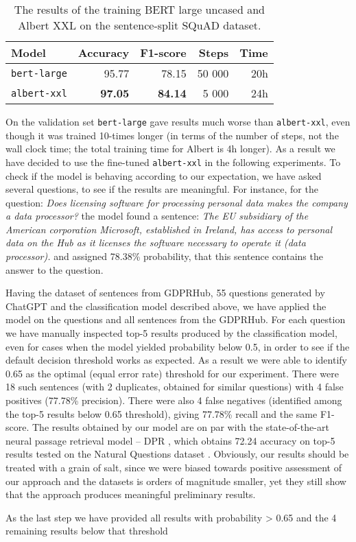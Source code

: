 \begin{table}[htbp]
    \centering\begin{tabular}{l r r r r}
        \hline
        \textbf{Model} & \textbf{Accuracy} & \textbf{F1-score} & \textbf{Steps} & \textbf{Time} \\
        \hline
        \texttt{bert-large} & 95.77 & 78.15 & 50 000 & 20h \\
        \hline
        \texttt{albert-xxl} & \textbf{97.05} & \textbf{84.14} & 5 000 & 24h \\
        \hline
    \end{tabular}
    \caption{The results of the training BERT large uncased and Albert XXL on the sentence-split SQuAD dataset.}
    \label{tab:bert-albert}
\end{table}

On the validation set \texttt{bert-large} gave results much worse than \texttt{albert-xxl}, even though it was trained 10-times longer 
(in terms of the number of steps, not the wall clock time; the total training time for Albert is 4h longer). 
As a result we have decided to use the fine-tuned \texttt{albert-xxl} 
in the following experiments. To check if the model is behaving according to our expectation, we have asked several questions,
to see if the results are meaningful. For instance, for the question: \textit{Does licensing software for processing personal data 
makes the company a data processor?} the model found a sentence: \textit{The EU subsidiary of the American corporation Microsoft, 
established in Ireland, has access to personal data on the Hub as it licenses the software necessary to operate it (data processor).}
and assigned 78.38\% probability, that this sentence contains the answer to the question.

Having the dataset of sentences from GDPRHub, 55 questions generated by ChatGPT and the classification model described above,
we have applied the model on the questions and all sentences from the GDPRHub. For each question we have manually inspected top-5 results
produced by the classification model, even for cases when the model yielded probability below 0.5, in order to see if the default
decision threshold works as expected. As a result we were able to identify 0.65 as the optimal (equal error rate) threshold for our 
experiment. There were 18 such sentences (with 2 duplicates, obtained for similar questions) with 4 false positives (77.78\% precision).
There were also 4 false negatives (identified among the top-5 results below 0.65 threshold), giving 77.78\% recall and the same F1-score. 
The results obtained by our model are on par with the state-of-the-art neural passage retrieval model -- DPR \cite{karpukhin2020dense},
which obtains 72.24 accuracy on top-5 results tested on the Natural Questions dataset \cite{kwiatkowski2019natural}. Obviously, 
our results should be treated with a grain of salt, since we were biased towards positive assessment of our approach and the 
datasets is orders of magnitude smaller, yet they still show that the approach produces meaningful preliminary results.

As the last step we have provided all results with probability > 0.65 and the 4 remaining results below that threshold 